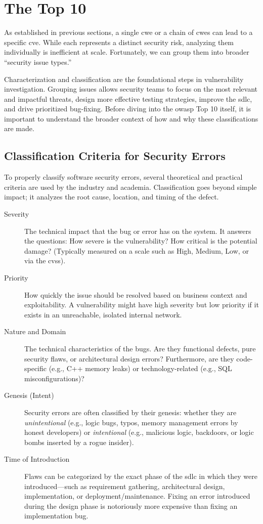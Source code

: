 \chapter{The  Top 10}
As established in previous sections, a single \gls{cwe} or a chain of \glspl{cwe} can lead to a specific \gls{cve}. While each represents a distinct security risk, analyzing them individually is inefficient at scale. Fortunately, we can group them into broader ``security issue types.'' 

Characterization and classification are the foundational steps in vulnerability investigation. Grouping issues allows security teams to focus on the most relevant and impactful threats, design more effective testing strategies, improve the \gls{sdlc}, and drive prioritized bug-fixing. Before diving into the \gls{owasp} Top 10 itself, it is important to understand the broader context of how and why these classifications are made.

\section{Classification Criteria for Security Errors}
To properly classify software security errors, several theoretical and practical criteria are used by the industry and academia. Classification goes beyond simple impact; it analyzes the root cause, location, and timing of the defect.

\begin{description}
    \item[Severity] The technical impact that the bug or error has on the system. It answers the questions: How severe is the vulnerability? How critical is the potential damage? (Typically measured on a scale such as High, Medium, Low, or via the \gls{cvss}).
    \item[Priority] How quickly the issue should be resolved based on business context and exploitability. A vulnerability might have high severity but low priority if it exists in an unreachable, isolated internal network.
    \item[Nature and Domain] The technical characteristics of the bugs. Are they functional defects, pure security flaws, or architectural design errors? Furthermore, are they code-specific (e.g., C++ memory leaks) or technology-related (e.g., SQL misconfigurations)?
    \item[Genesis (Intent)] Security errors are often classified by their genesis: whether they are \textit{unintentional} (e.g., logic bugs, typos, memory management errors by honest developers) or \textit{intentional} (e.g., malicious logic, backdoors, or logic bombs inserted by a rogue insider).
    \item[Time of Introduction] Flaws can be categorized by the exact phase of the \gls{sdlc} in which they were introduced—such as requirement gathering, architectural design, implementation, or deployment/maintenance. Fixing an error introduced during the design phase is notoriously more expensive than fixing an implementation bug.
\end{description}


